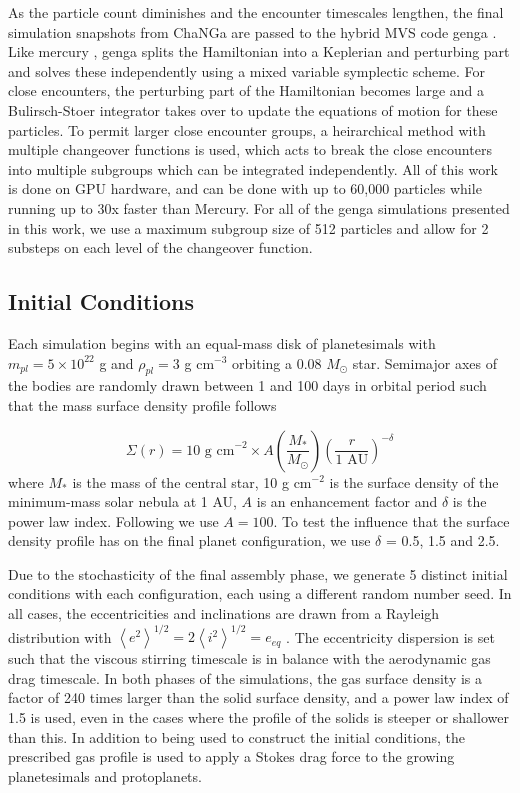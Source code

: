 As the particle count diminishes and the encounter timescales lengthen, the final simulation snapshots from {\sc ChaNGa} are 
passed to the hybrid MVS code {\sc genga} \cite{grimm14, grimm22}. Like {\sc mercury} \cite{chambers99}, {\sc genga} splits 
the Hamiltonian into a Keplerian and perturbing part and solves these independently using a mixed variable symplectic 
scheme. For close encounters, the perturbing part of the Hamiltonian becomes large and a Bulirsch-Stoer integrator takes over 
to update the equations of motion for these particles. To permit larger close encounter groups, a heirarchical method with 
multiple changeover functions is used, which acts to break the close encounters into multiple subgroups which can be 
integrated independently. All of this work is done on GPU hardware, and can be done with up to 60,000 particles while running 
up to 30x faster than {\sc Mercury}. For all of the {\sc genga} simulations presented in this work, we use a maximum subgroup 
size of 512 particles and allow for 2 substeps on each level of the changeover function.

\subsection{Initial Conditions} \label{sec:ics}

Each simulation begins with an equal-mass disk of planetesimals with $m_{pl} = 5 \times 10^{22}$ g and $\rho_{pl} = 3$ g cm$^{-3}$ orbiting a 0.08 $M_{\odot}$ star. Semimajor axes of the bodies are randomly drawn between 1 and 100 days in orbital period such that the mass surface density profile follows

\begin{equation}
	\Sigma(r) = \textrm{10 g cm}^{-2} \times A \left( \frac{M_{*}}{M_{\odot}} \right) \left( \frac{r}{\textrm{1 AU}} \right)^{-\delta}
\end{equation}
where $M_{*}$ is the mass of the central star, 10 g
cm$^{-2}$ is the surface density of the minimum-mass solar nebula
\cite[MMSN]{hayashi81} at 1 AU, $A$ is an enhancement factor and $\delta$ is the power law index. Following \cite{hansen12} we use $A = 100$. To test the influence that the surface density profile has on the final planet configuration, we use $\delta$ = 0.5, 1.5 and 2.5. 

Due to the stochasticity of the final assembly phase, we generate 5 distinct initial conditions with each configuration, each using a different random number seed. In all cases, the eccentricities and inclinations are drawn from a Rayleigh distribution with $\left< e^{2} \right>^{1/2} = 2\left<i^{2} \right>^{1/2} = e_{eq}$ \cite{ida93}. The eccentricity dispersion is set such that the viscous stirring timescale is in balance with the aerodynamic gas drag timescale. In both phases of the simulations, the gas surface density is a factor of 240 times larger than the solid surface density, and a power law index of 1.5 is used, even in the cases where the profile of the solids is steeper or shallower than this. In addition to being used to construct the initial conditions, the prescribed gas profile is used to apply a Stokes drag force to the growing planetesimals and protoplanets.

